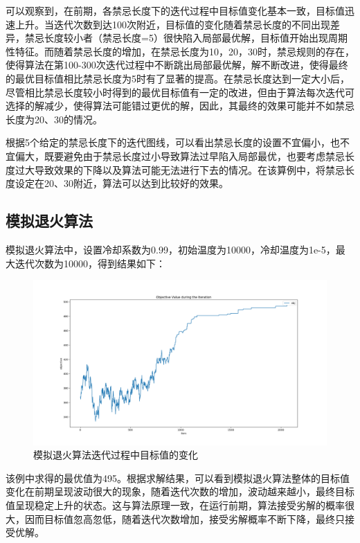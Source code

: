 \documentclass{article}
\begin{document}
    可以观察到，在前期，各禁忌长度下的迭代过程中目标值变化基本一致，目标值迅速上升。当迭代次数到达100次附近，目标值的变化随着禁忌长度的不同出现差异，禁忌长度较小者（禁忌长度=5）很快陷入局部最优解，目标值开始出现周期性特征。而随着禁忌长度的增加，在禁忌长度为10，20，30时，禁忌规则的存在，使得算法在第100-300次迭代过程中不断跳出局部最优解，解不断改进，使得最终的最优目标值相比禁忌长度为5时有了显著的提高。在禁忌长度达到一定大小后，尽管相比禁忌长度较小时得到的最优目标值有一定的改进，但由于算法每次迭代可选择的解减少，使得算法可能错过更优的解，因此，其最终的效果可能并不如禁忌长度为20、30的情况。
    
    根据5个给定的禁忌长度下的迭代图线，可以看出禁忌长度的设置不宜偏小，也不宜偏大，既要避免由于禁忌长度过小导致算法过早陷入局部最优，也要考虑禁忌长度过大导致效果的下降以及算法可能无法进行下去的情况。在该算例中，将禁忌长度设定在20、30附近，算法可以达到比较好的效果。

    \subsection{模拟退火算法}
    模拟退火算法中，设置冷却系数为0.99，初始温度为10000，冷却温度为1e-5，最大迭代次数为10000，得到结果如下：
    \begin{figure}[H]
        \centering
        \includegraphics[width=\textwidth]{./image/sa.png}
        \caption{模拟退火算法迭代过程中目标值的变化}
    \end{figure}

    该例中求得的最优值为495。根据求解结果，可以看到模拟退火算法整体的目标值变化在前期呈现波动很大的现象，随着迭代次数的增加，波动越来越小，最终目标值呈现稳定上升的状态。这与算法原理一致，在运行前期，算法接受劣解的概率很大，因而目标值忽高忽低，随着迭代次数增加，接受劣解概率不断下降，最终只接受优解。
\end{document}
